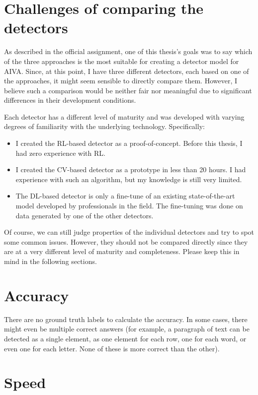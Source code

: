\documentclass[
  digital,     %
  oneside,     %
  nosansbold,  %
  nocolorbold, %
  lof,         %
  lot,         %
]{fithesis4}
\begin{document}
\section{Challenges of comparing the detectors}
As described in the official assignment, one of this thesis's goals was to say which of the three approaches is the most suitable for creating a detector model for AIVA. Since, at this point, I have three different detectors, each based on one of the approaches, it might seem sensible to directly compare them. However, I believe such a comparison would be neither fair nor meaningful due to significant differences in their development conditions.

Each detector has a different level of maturity and was developed with varying degrees of familiarity with the underlying technology. Specifically:
\begin{itemize}
    \item I created the RL-based detector as a proof-of-concept. Before this thesis, I had zero experience with RL.
    \item I created the CV-based detector as a prototype in less than 20 hours. I had experience with such an algorithm, but my knowledge is still very limited.
    \item The DL-based detector is only a fine-tune of an existing state-of-the-art model developed by professionals in the field. The fine-tuning was done on data generated by one of the other detectors.
\end{itemize}

Of course, we can still judge properties of the individual detectors and try to spot some common issues. However, they should not be compared directly since they are at a very different level of maturity and completeness. Please keep this in mind in the following sections.

\section{Accuracy}

There are no ground truth labels to calculate the accuracy. In some cases, there might even be multiple correct answers (for example, a paragraph of text can be detected as a single element, as one element for each row, one for each word, or even one for each letter. None of these is more correct than the other).
\section{Speed}
\end{document}
